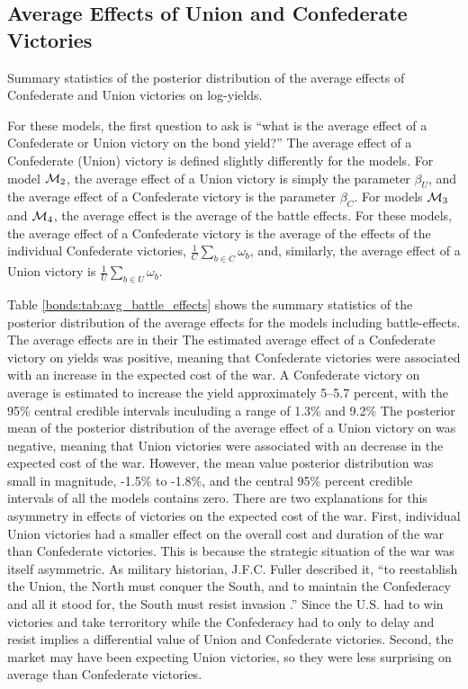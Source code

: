 \subsection{Average Effects of Union and Confederate Victories}
\label{sec:future-battles}

\begin{table}
  \centering
  
  \caption[Average effects of Confederate and Union victories on log-yields.]{Summary statistics of the posterior distribution of the average effects of Confederate and Union victories on log-yields.}
  \label{bonds:tab:avg_battle_effects}
\end{table}

For these models, the first question to ask is ``what is the average effect of a Confederate or Union victory on the bond yield?''
The average effect of a Confederate (Union) victory is defined slightly differently for the models.
For model $\mathcal{M}_{\text{2}}$, the average effect of a Union victory is simply the parameter $\beta_{U}$, and the average effect of a Confederate victory is the parameter $\beta_{C}$. 
For models $\mathcal{M}_{\text{3}}$ and $\mathcal{M}_{\text{4}}$, the average effect is the average of the battle effects.
For these models, the average effect of a Confederate victory is the average of the effects of the individual Confederate victories, $\frac{1}{C}\sum_{b \in C} \omega_{b}$, and, similarly, the average effect of a Union victory is $\frac{1}{U}\sum_{b \in U} \omega_{b}$.

Table \ref{bonds:tab:avg_battle_effects} shows the summary statistics of the posterior distribution of the average effects for the models including battle-effects.
The average effects are in their 
The estimated average effect of a Confederate victory on yields was positive, meaning that Confederate victories were associated with an increase in the expected cost of the war.
A Confederate victory on average is estimated to increase the yield approximately 5--5.7 percent, with the 95\% central credible intervals inculuding a range of 1.3\% and 9.2\%
The posterior mean of the posterior distribution of the average effect of a Union victory on was negative, meaning that Union victories were associated with an decrease in the expected cost of the war.
However, the mean value posterior distribution was small in magnitude, -1.5\% to -1.8\%, and the central 95\% percent credible intervals of all the models contains zero.
There are two explanations for this asymmetry in effects of victories on the expected cost of the war.
First, individual Union victories had a smaller effect on the overall cost and duration of the war than Confederate victories.
This is because the strategic situation of the war was itself asymmetric. 
As military historian, J.F.C. Fuller described it, ``to reestablish the Union, the North must conquer the South, and to maintain the Confederacy and all it stood for, the South must resist invasion \parencite[177]{Fuller1942a}.'' 
Since the U.S. had to win victories and take terroritory while the Confederacy had to only to delay and resist implies a differential value of Union and Confederate victories.
Second, the market may have been expecting Union victories, so they were less surprising on average than Confederate victories.


